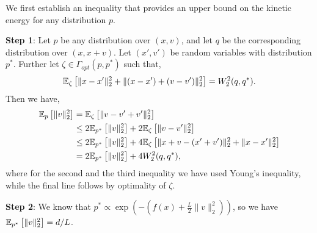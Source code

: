 \begin{Proof} We first establish an inequality that provides an upper bound on the kinetic energy for any distribution $p$.

\textbf{Step 1}:  Let $p$ be any distribution over $(x,v)$, and let $q$ be the corresponding distribution over $(x,x+v)$. Let $(x',v')$ be random variables with distribution $p^*$. Further let $\zeta \in \Gamma_{opt}(p,p^*)$ such that,
 $$\mathbb{E}_{\zeta} \left[\lVert x-x'\rVert_2^2 + \lVert (x-x')+(v-v')\rVert_2^2 \right] = W_2^2(q,q^*).$$ Then we have,
\begin{align}
\nonumber\mathbb{E}_{p}\left[\|v\|_2^2\right] & = \mathbb{E}_{\zeta}\left[\lVert v- v' + v'\rVert^2_2\right]\\
\nonumber & \le 2\mathbb{E}_{p^*}\left[\|v \|_2^2\right] + 2  \mathbb{E}_{\zeta}\left[ \lVert v- v' \rVert^2_2\right]\\
\nonumber & \le 2\mathbb{E}_{p^*}\left[\|v \|_2^2\right] + 4 \mathbb{E}_{\zeta}\left[ \lVert x+v - (x'+v') \rVert^2_2 + \lVert x - x' \rVert_2^2 \right]\\
& = 2\mathbb{E}_{p^*}\left[\|v \|_2^2\right] + 4 W_2^2 (q,q^*), \label{e:kineticlessthanwasserstein}
\end{align}
where for the second and the third inequality we have used Young's inequality, while the final line follows by optimality of $\zeta$. 

\textbf{Step 2}: We know that $p^*\propto \exp(-(f(x) + \frac{L}{2}\|v\|_2^2))$, so we have $\mathbb{E}_{p^*}\left[\|v\|_2^2\right] = d/L$. 


\end{Proof}

